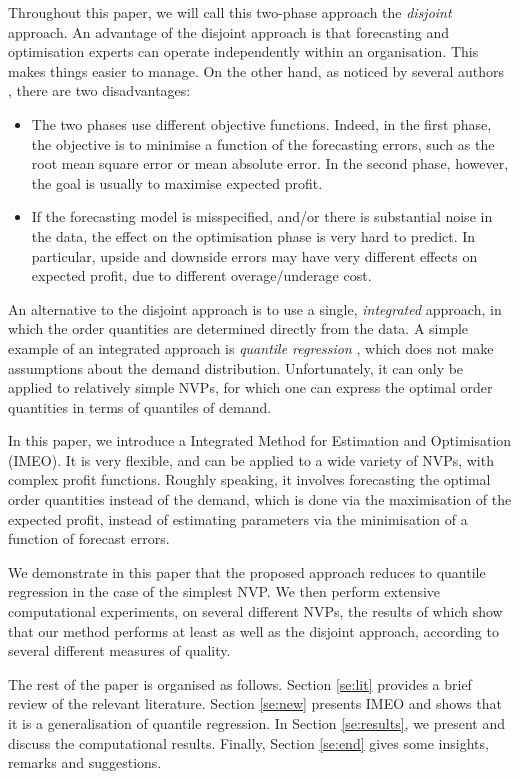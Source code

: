 \documentclass{article}
\begin{document}
Throughout this paper, we will call this two-phase approach the \emph{disjoint} approach. An advantage of the disjoint approach is that forecasting and optimisation experts can operate independently within an organisation. This makes things easier to manage. On the other hand, as noticed by several authors \cite{BT06,BM12,Ka94,KT96,KTB20}, there are two disadvantages:
\begin{itemize}
\item The two phases use different objective functions. Indeed, in the first phase, the objective is to minimise a function of the forecasting errors, such as the root mean square error or mean absolute error. In the second phase, however, the goal is usually to maximise expected profit.
\item If the forecasting model is misspecified, and/or there is substantial noise in the data, the effect on the optimisation phase is very hard to predict. In particular, upside and downside errors may have very different effects on expected profit, due to different overage/underage cost.
\end{itemize}

An alternative to the disjoint approach is to use a single, \textit{integrated} approach, in which the order quantities are determined directly from the data. A simple example of an integrated approach is \emph{quantile regression} \cite{Br16,Hu19}, which does not make assumptions about the demand distribution. Unfortunately, it can only be applied to relatively simple NVPs, for which one can express the optimal order quantities in terms of quantiles of demand.

In this paper, we introduce a Integrated Method for Estimation and Optimisation (IMEO). It is very flexible, and can be applied to a wide variety of NVPs, with complex profit functions. Roughly speaking, it involves forecasting the optimal order quantities instead of the demand, which is done via the maximisation of the expected profit, instead of estimating parameters via the minimisation of a function of forecast errors.

We demonstrate in this paper that the proposed approach reduces to quantile regression in the case of the simplest NVP. We then perform extensive computational experiments, on several different NVPs, the results of which show that our method performs at least as well as the disjoint approach, according to several different measures of quality.

The rest of the paper is organised as follows. Section \ref{se:lit} provides a brief review of the relevant literature. Section \ref{se:new} presents IMEO and shows that it is a generalisation of quantile regression. In Section \ref{se:results}, we present and discuss the computational results. Finally, Section \ref{se:end} gives some insights, remarks and suggestions.
\end{document}

